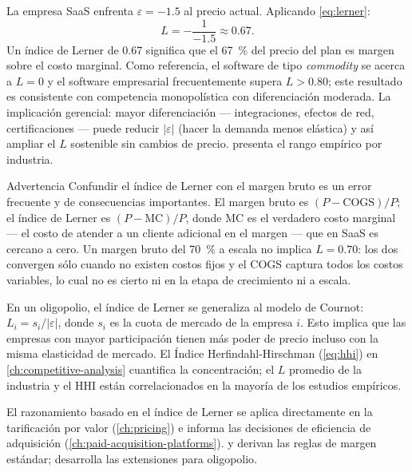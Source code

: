 \begin{example}
La empresa SaaS enfrenta \(\varepsilon=-1.5\) al precio actual. Aplicando \cref{eq:lerner}:
\[
  L = -\frac{1}{-1.5} \approx 0.67.
\]
Un índice de Lerner de \num{0.67} significa que el \qty{67}{\percent} del precio del plan 
es margen sobre el costo marginal. Como referencia, el software de tipo \emph{commodity} se acerca
a \(L=0\) y el software empresarial frecuentemente supera \(L>0.80\); este resultado es consistente
con competencia monopolística con diferenciación moderada. La implicación gerencial: mayor
diferenciación --- integraciones, efectos de red, certificaciones --- puede reducir \(|\varepsilon|\)
(hacer la demanda menos elástica) y así ampliar el \(L\) sostenible sin cambios de precio.
\textcite{dranove7theconomics} presenta el rango empírico por industria.
\end{example}

\begin{admonition}{Advertencia}
Confundir el índice de Lerner con el margen bruto es un error frecuente y de consecuencias
importantes. El margen bruto es \((P-\mathrm{COGS})/P\); el índice de Lerner es
\((P-\mathrm{MC})/P\), donde \(\mathrm{MC}\) es el verdadero costo marginal --- el costo de
atender a un cliente adicional en el margen --- que en SaaS es cercano a cero. Un margen bruto del
\qty{70}{\percent} a escala no implica \(L=0.70\): los dos convergen sólo cuando no existen costos
fijos y el COGS captura todos los costos variables, lo cual no es cierto ni en la etapa de
crecimiento ni a escala.
\end{admonition}

En un oligopolio, el índice de Lerner se generaliza al modelo de Cournot: \(L_i = s_i / |\varepsilon|\),
donde \(s_i\) es la cuota de mercado de la empresa \(i\). Esto implica que las empresas con mayor
participación tienen más poder de precio incluso con la misma elasticidad de mercado. El Índice
Herfindahl-Hirschman (\cref{eq:hhi}) en \cref{ch:competitive-analysis} cuantifica la concentración;
el \(L\) promedio de la industria y el HHI están correlacionados en la mayoría de los estudios empíricos.

El razonamiento basado en el índice de Lerner se aplica directamente en la tarificación por valor
(\cref{ch:pricing}) e informa las decisiones de eficiencia de adquisición
(\cref{ch:paid-acquisition-platforms}). \textcite{pindyck2017} y \textcite{mankiw2020} derivan las
reglas de margen estándar; \textcite{dranove7theconomics} desarrolla las extensiones para oligopolio.

